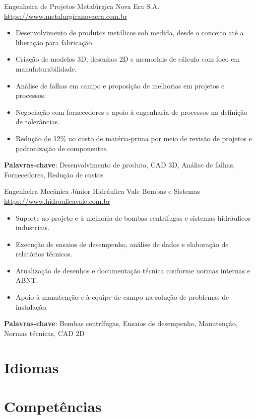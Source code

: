 \documentclass[a4paper, serif, 10pt]{moderncv}
\begin{document}
        {Engenheira de Projetos}
        {Metalúrgica Nova Era S.A.}
        {\url{https://www.metalurgicanovaera.com.br}}
        {}
        {\begin{itemize}
\item Desenvolvimento de produtos metálicos sob medida, desde o conceito até a liberação para fabricação.
\item Criação de modelos 3D, desenhos 2D e memoriais de cálculo com foco em manufaturabilidade.
\item Análise de falhas em campo e proposição de melhorias em projetos e processos.
\item Negociação com fornecedores e apoio à engenharia de processos na definição de tolerâncias.
\item Redução de 12\% no custo de matéria-prima por meio de revisão de projetos e padronização de componentes.
\end{itemize}
\textbf{Palavras-chave}: Desenvolvimento de produto, CAD 3D, Análise de falhas, Fornecedores, Redução de custos}

        {Engenheira Mecânica Júnior}
        {Hidráulica Vale Bombas e Sistemas}
        {\url{https://www.hidraulicavale.com.br}}
        {}
        {\begin{itemize}
\item Suporte ao projeto e à melhoria de bombas centrífugas e sistemas hidráulicos industriais.
\item Execução de ensaios de desempenho, análise de dados e elaboração de relatórios técnicos.
\item Atualização de desenhos e documentação técnica conforme normas internas e ABNT.
\item Apoio à manutenção e à equipe de campo na solução de problemas de instalação.
\end{itemize}
\textbf{Palavras-chave}: Bombas centrífugas, Ensaios de desempenho, Manutenção, Normas técnicas, CAD 2D}
\section{Idiomas}

\section{Competências}
\end{document}
